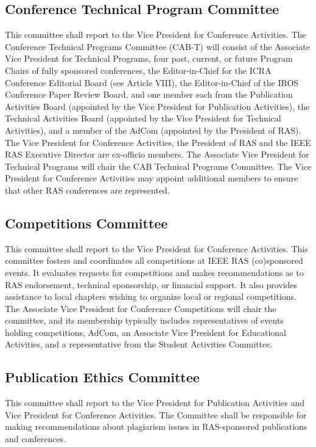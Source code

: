 \documentclass[10pt]{article}
\begin{document}
\subsection{Conference Technical Program Committee}
This committee shall report to the Vice President for Conference Activities. The Conference Technical Programs Committee (CAB-T) will consist of the Associate Vice President for Technical Programs, four past, current, or future Program Chairs of fully sponsored conferences, the Editor-in-Chief for the ICRA Conference Editorial Board (see Article VIII), the Editor-in-Chief of the IROS Conference Paper Review Board, and one member each from the Publication Activities Board (appointed by the Vice President for Publication Activities), the Technical Activities Board (appointed by the Vice President for Technical Activities), and a member of the AdCom (appointed by the President of RAS).  The Vice President for Conference Activities, the President of RAS and the IEEE RAS Executive Director are ex-officio members. The Associate Vice President for Technical Programs will chair the CAB Technical Programs Committee. The Vice President for Conference Activities may appoint additional members to ensure that other RAS conferences are represented.



\subsection{Competitions Committee}
This committee shall report to the Vice President for Conference Activities. This committee fosters and coordinates all competitions at IEEE RAS (co)sponsored events.  It evaluates requests for competitions and makes recommendations as to RAS endorsement, technical sponsorship, or financial support.  It also provides assistance to local chapters wishing to organize local or regional competitions. The Associate Vice President for Conference Competitions will chair the committee, and its membership typically includes representatives of events holding competitions, AdCom, an Associate Vice President for Educational Activities, and a representative from the Student Activities Committee.



\subsection{Publication Ethics Committee}

This committee shall report to the Vice President for Publication Activities and Vice President for Conference Activities. The Committee shall be responsible for making recommendations about plagiarism issues in RAS-sponsored publications and conferences.
\end{document}
